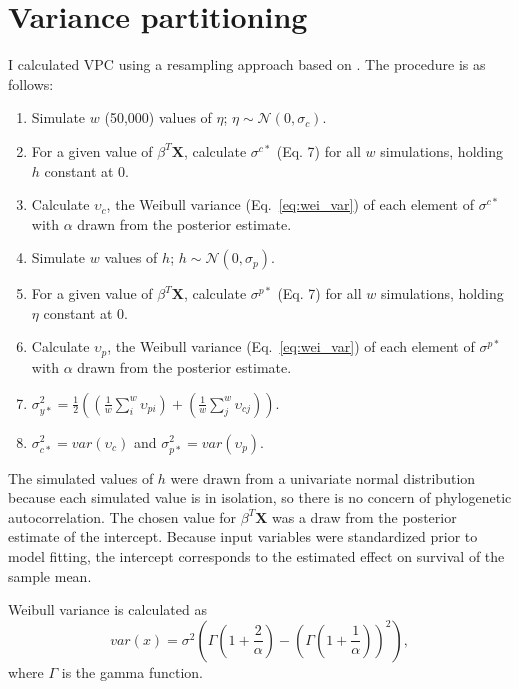 \documentclass{article}
\begin{document}
\section{Variance partitioning}
I calculated VPC using a resampling approach based on \cite{Goldstein2002}. The procedure is as follows:
\begin{enumerate}
  \item Simulate \(w\) (50,000) values of \(\eta\); \(\eta \sim \mathcal{N}(0, \sigma_{c})\).
  \item For a given value of \(\beta^{T} \mathbf{X}\), calculate \(\sigma^{c*}\) (Eq. 7) for all \(w\) simulations, holding \(h\) constant at 0.
  \item Calculate \(\upsilon_{c}\), the Weibull variance (Eq.~\ref{eq:wei_var}) of each element of \(\sigma^{c*}\) with \(\alpha\) drawn from the posterior estimate.
  \item Simulate \(w\) values of \(h\); \(h \sim \mathcal{N}(0, \sigma_{p})\). 
  \item For a given value of \(\beta^{T} \mathbf{X}\), calculate \(\sigma^{p*}\) (Eq. 7) for all \(w\) simulations, holding \(\eta\) constant at 0.
  \item Calculate \(\upsilon_{p}\), the Weibull variance (Eq.~\ref{eq:wei_var}) of each element of \(\sigma^{p*}\) with \(\alpha\) drawn from the posterior estimate.
  \item \(\sigma_{y*}^{2} = \frac{1}{2} \left(\left(\frac{1}{w} \sum_{i}^{w} \upsilon_{pi}\right) + \left(\frac{1}{w} \sum_{j}^{w} \upsilon_{cj}\right)\right)\).
  \item \(\sigma_{c*}^{2} = var(\upsilon_{c})\) and \(\sigma_{p*}^{2} = var(\upsilon_{p})\).
\end{enumerate}

The simulated values of \(h\) were drawn from a univariate normal distribution because each simulated value is in isolation, so there is no concern of phylogenetic autocorrelation. The chosen value for \(\beta^{T} \mathbf{X}\) was a draw from the posterior estimate of the intercept. Because input variables were standardized prior to model fitting, the intercept corresponds to the estimated effect on survival of the sample mean.

Weibull variance is calculated as
\begin{equation}
  var(x) = \sigma^{2}\left(\Gamma\left(1 + \frac{2}{\alpha}\right) - \left(\Gamma\left(1 + \frac{1}{\alpha}\right)\right)^{2}\right),
  \label{eq:wei_var} \end{equation}
where \(\Gamma\) is the gamma function. 
\end{document}

